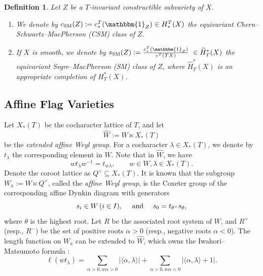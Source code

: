 \documentclass[12pt]{amsart}
\newtheorem{Defin}[Th]{Definition}
\def\CSM{c_{\rm SM}}
\def\SSM{s_{\rm SM}}
\begin{document}
\begin{Defin}
Let $Z$ be a $T$-invariant constructible subvariety of $X$. 
\begin{enumerate}
\item
We denote by $\CSM(Z):=c_*^T(\mathbbm{1}_{Z}) {~\in H_*^T(X)}$ the {\em equivariant Chern--Schwartz--MacPherson (CSM) class\/} of $Z$. 
\item 
If $X$ is smooth, we denote by $\SSM(Z):=\frac{c_*^T(\mathbbm{1}_{Z})}{c^T(T X)} ~\in \widehat{H}^*_T(X)$ 
the {\em equivariant Segre--MacPherson (SM) class\/} of $Z$, where $\widehat{H}^*_T(X)$ is an appropriate completion
of $H^*_T(X)$. 
\end{enumerate}
\end{Defin}




\subsection{Affine Flag Varieties}
Let $X_*(T)$ be the cocharacter lattice of $T$, and let 
$$\widehat{W}:=W\ltimes X_*(T)$$ be the \emph{extended affine Weyl group}.
For a cocharacter $\lambda\in X_*(T)$, we denote by $t_\lambda$ the corresponding element in $\widehat{W}$. Note that in $\widehat{W}$, we have 
$$wt_\lambda w^{-1}=t_{w\lambda},\qquad w\in W,\lambda\in X_*(T).$$
Denote the coroot lattice as $Q^\vee\subseteq X_*(T)$. 
It is known that the subgroup $W_a:=W\ltimes Q^\vee$, called the \emph{affine Weyl group}, is the Coxeter group of the corresponding affine Dynkin diagram \cite{Kac} with generators
$$s_i\in W\, (i\in I),\quad\text{ and \quad} s_0=t_{\theta^\vee}s_\theta,
$$
where $\theta$ is the highest root. 
Let $R$ be the associated root system of $W$, and   $R^+$ (resp., $R^-$) be the set of positive roots $\alpha>0$ (resp., negative roots $\alpha<0$).
The length function on $W_a$ can be extended to $\widehat{W}$, which owns  the Iwahori--Matsumoto  formula \cite{IwaMat}:
$$\ell(wt_\lambda)
=
\sum_{\alpha>0,w\alpha>0}\big|\langle \alpha,\lambda\rangle\big|+
\sum_{\alpha>0,w\alpha<0}\big|\langle \alpha,\lambda\rangle+1\big|.
$$ 
\end{document}
